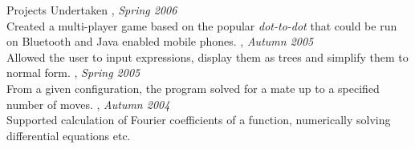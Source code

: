 \documentclass[final]{resume}
\begin{document}
\begin{category}{Projects Undertaken}
, \emph{Spring 2006}\\
Created a multi-player game based on the popular \emph{dot-to-dot} that could be run on Bluetooth and Java enabled mobile phones.
, \emph{Autumn 2005}\\
Allowed the user to input expressions, display them as trees and simplify them to normal form.
, \emph{Spring 2005}\\
From a given configuration, the program solved for a mate up to a specified number of moves.
, \emph{Autumn 2004}\\
Supported calculation of Fourier coefficients of a function, numerically solving differential equations etc.
\end{category}


% 
\end{document}
